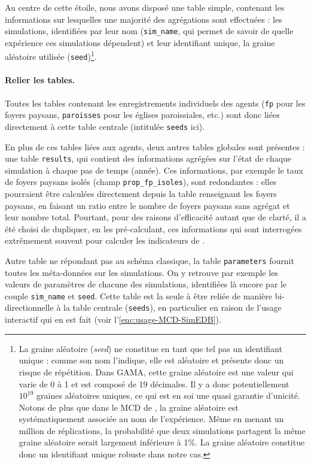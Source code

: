 Au centre de cette étoile, nous avons disposé une table simple, contenant les informations sur lesquelles une majorité des agrégations sont effectuées : les simulations, identifiées par leur nom (\texttt{sim\_name}, qui permet de savoir de quelle expérience ces simulations dépendent) et leur identifiant unique, la graine aléatoire utilisée (\texttt{seed})\footnote{
	La graine aléatoire (\textit{seed}) ne constitue en tant que tel pas un identifiant unique : comme son nom l'indique, elle est aléatoire et présente donc un risque de répétition.
	Dans GAMA, cette graine aléatoire est une valeur qui varie de 0 à 1 et est composé de 19 décimales.
	Il y a donc potentiellement $10^{19}$ graines aléatoires uniques, ce qui est en soi une quasi garantie d'unicité.
	Notons de plus que dans le MCD de \simedb{}, la graine aléatoire est systématiquement associée au nom de l'expérience.
	Même en menant un million de réplications, la probabilité que deux simulations partagent la même graine aléatoire serait largement inférieure à 1\%.
	La graine aléatoire constitue donc un identifiant unique robuste dans notre cas.
}.

\paragraph{Relier les tables.}

Toutes les tables contenant les enregistrements individuels des agents (\texttt{fp} pour les foyers paysans, \texttt{paroisses} pour les églises paroissiales, etc.) sont donc liées directement à cette table centrale (intitulée \texttt{seeds} ici).

En plus de ces tables liées aux agents, deux autres tables \og globales\fg{} sont présentes : une table \og \texttt{results}\fg{}, qui contient des informations agrégées sur l'état de chaque simulation à chaque pas de temps (année).
Ces informations, par exemple le taux de foyers paysans isolés (champ \og \texttt{prop\_fp\_isoles}\fg{}), sont redondantes : elles pourraient être calculées directement depuis la table renseignant les foyers paysans, en faisant un ratio entre le nombre de foyers paysans sans agrégat et leur nombre total.
Pourtant, pour des raisons d'efficacité autant que de clarté, il a été choisi de dupliquer, en les pré-calculant, ces informations qui sont interrogées extrêmement souvent pour calculer les indicateurs de \simfeodal{}.

Autre table ne répondant pas au schéma classique, la table \og \texttt{parameters}\fg{} fournit toutes les méta-données sur les simulations.
On y retrouve par exemple les valeurs de paramètres de chacune des simulations, identifiées là encore par le couple \texttt{sim\_name} et \texttt{seed}.
Cette table est la seule à être reliée de manière bi-directionnelle à la table centrale (\texttt{seeds}), en particulier en raison de l'usage interactif qui en est fait (voir l'\cref{enc:usage-MCD-SimEDB}).

